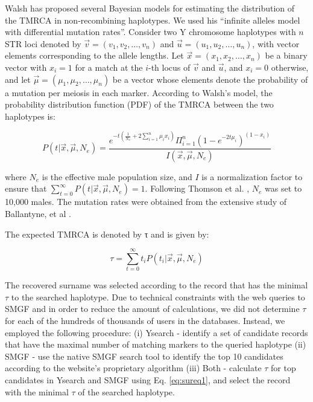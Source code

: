 Walsh \cite{Walsh2001} has proposed several Bayesian models for estimating the distribution of the TMRCA in non-recombining haplotypes. We used his ``infinite alleles model with differential mutation rates''. Consider two Y chromosome haplotypes with $n$ STR loci denoted by $\vec{v}=(v_1,v_2,\hdots,v_n)$ and $\vec{u}=(u_1,u_2,\hdots,u_n)$, with vector elements corresponding to the allele lengths. Let $\vec{x} = (x_1,x_2,\hdots,x_n)$ be a binary vector with $x_i=1$ for a match at the $i$-th locus of $\vec{v}$ and $\vec{u}$, and $x_i=0$ otherwise, and let $\vec{\mu}=(\mu_1,\mu_2,\hdots,\mu_n)$ be a vector whose elements denote the probability of a mutation per meiosis in each marker. According to Walsh's model, the probability distribution function (PDF) of the TMRCA between the two haplotypes is:

\begin{equation}
\label{eq:sureq1}
P(t|\vec{x},\vec{\mu}, N_e) = \frac{e^{-t(\frac{1}{N_e}+2\sum_{i=1}^n\mu_ix_i)}\Pi_{i=1}^n(1-e^{-2t\mu_i})^{(1-x_i)}}{I(\vec{x},\vec{\mu},N_e)}
\end{equation}

where $N_e$ is the effective male population size, and $I$ is a normalization factor to ensure that $\sum_{t=0}^{\infty}P(t|\vec{x},\vec{\mu},N_e)=1$. Following Thomson et al. \cite{ThomsonPritchardShenEtAl2000}, $N_e$ was set to 10,000 males. The mutation rates were obtained from the extensive study of Ballantyne, et al \cite{BallantyneGoedbloedFangEtAl2010}.

The expected TMRCA is denoted by τ and is given by:

\begin{equation}
\tau = \sum_{t=0}^{\infty}t_i P(t_i|\vec{x}, \vec{\mu}, N_e)
\end{equation}

The recovered surname was selected according to the record that has the minimal $\tau$ to the searched haplotype. Due to technical constraints with the web queries to SMGF and in order to reduce the amount of calculations, we did not determine $\tau$ for each of the hundreds of thousands of users in the databases. Instead, we employed the following procedure: (i) Ysearch - identify a set of candidate records that have the maximal number of matching markers to the queried haplotype (ii) SMGF - use the native SMGF search tool to identify the top 10 candidates according to the website's proprietary algorithm (iii) Both - calculate $\tau$ for top candidates in Ysearch and SMGF using Eq. \ref{eq:sureq1}, and select the record with the minimal $\tau$ of the searched haplotype. 

